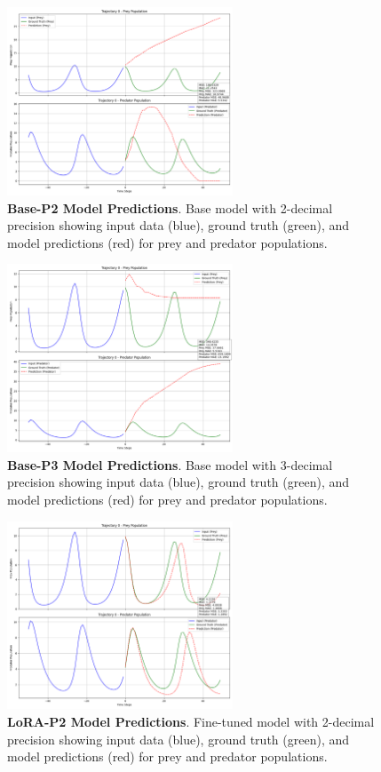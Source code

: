 \documentclass{article}
\begin{document}
\begin{figure}[H]
    \centering
    \includegraphics[width=0.6\textwidth]{trajectory_0_prediction_p2}
    \caption{\textbf{Base-P2 Model Predictions}. Base model with 2-decimal precision showing input data (blue), ground truth (green), and model predictions (red) for prey and predator populations.}
    \label{fig:base_p2_predictions_sample}
\end{figure}

\begin{figure}[H]
    \centering
    \includegraphics[width=0.6\textwidth]{trajectory_0_prediction_p3}
    \caption{\textbf{Base-P3 Model Predictions}. Base model with 3-decimal precision showing input data (blue), ground truth (green), and model predictions (red) for prey and predator populations.}
    \label{fig:base_p3_predictions_sample}
\end{figure}

\begin{figure}[H]
    \centering
    \includegraphics[width=0.6\textwidth]{trajectory_0_prediction_final}
    \caption{\textbf{LoRA-P2 Model Predictions}. Fine-tuned model with 2-decimal precision showing input data (blue), ground truth (green), and model predictions (red) for prey and predator populations.}
    \label{fig:lora_p2_predictions_sample}
\end{figure}
\end{document}
